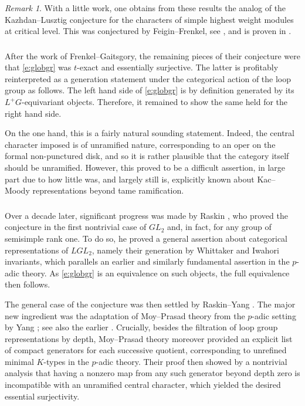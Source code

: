 \documentclass[10pt]{amsart}
\theoremstyle{remark}
\newtheorem{re}[subsubsection]{Remark}
\numberwithin{equation}{section}
\begin{document}
	\begin{re} With a little work, one obtains from these results the analog of the Kazhdan--Lusztig conjecture for the characters of simple highest weight modules at critical level. This was conjectured by Feigin--Frenkel, see \cite{arakawafiebig}, and is proven in \cite{DhillonYang}. 
	\end{re}
	
	
	
\subsubsection{} After the work of Frenkel--Gaitsgory, the remaining pieces of their conjecture were that \eqref{e:globgr} was $t$-exact and essentially surjective. The latter is profitably reinterpreted as a generation statement under the categorical action of the loop group as follows. The left hand side of \eqref{e:globgr} is by definition generated by 
	its $L^+G$-equivariant objects. Therefore, it remained to show the same held 
	for the right hand side. 
	
	On the one hand, this is a fairly natural sounding 
	statement. Indeed, the central character imposed is of unramified nature, 
	corresponding to an oper on the formal non-punctured disk, and so it is 
	rather plausible that the category itself should be unramified. However, 
	this proved to be a difficult assertion, in large part due to how little 
	was, and largely still is, explicitly known about 
	Kac--Moody representations beyond tame 
	ramification. 
	
	
	\subsubsection{} Over a decade later, significant progress was made by 
	Raskin \cite{RaskinLocCrit}, who proved the conjecture in the first nontrivial case of $GL_2$ 
	and, in fact, for any group of semisimple rank one. To do so, he 
	proved a general assertion about categorical representations of $LGL_2$, 
	namely their generation by Whittaker and Iwahori invariants, which 
	parallels an earlier and similarly fundamental assertion in the $p$-adic 
	theory. As \eqref{e:globgr} is an equivalence on such objects, the full equivalence then follows.  
	
	The general case of the conjecture was then settled by Raskin--Yang \cite{RaskinYang}. The 
	major new ingredient was the adaptation of Moy--Prasad theory from 
	the $p$-adic setting by Yang \cite{yangmoyprasad}; see also the earlier \cite{chenkamgarpour}. Crucially, besides the filtration of loop group representations by depth, Moy--Prasad theory moreover 
	provided an explicit list of compact generators for each successive 
	quotient, corresponding to unrefined minimal $K$-types in the $p$-adic theory. Their proof then showed by a nontrivial analysis that having a 
	nonzero map from any such generator beyond depth zero is incompatible 
	with an unramified central character, which yielded the desired essential 
	surjectivity. 
	
\end{document}
